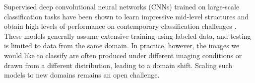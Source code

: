 



Supervised deep convolutional neural networks (CNNs) trained on large-scale
classification tasks have been shown to learn impressive mid-level structures
and obtain high levels of performance on contemporary classification
challenges \cite{ilsvrc2012,zeiler-arxiv-2013}. These models generally assume
extensive training using labeled data, and testing is limited to data from the
same domain. In practice, however, the images we would like to classify are
often produced under different imaging conditions or drawn from a different
distribution, leading to a domain shift. Scaling such models to new domains
remains an open challenge.


